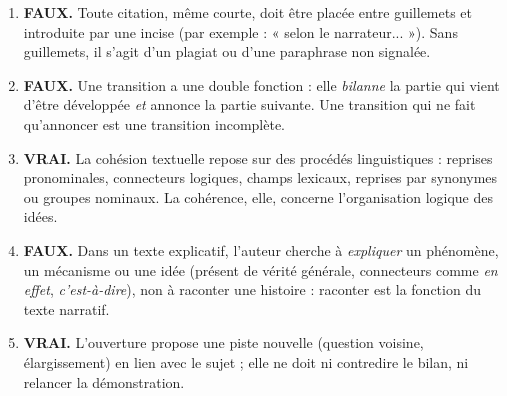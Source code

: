 \documentclass[11pt]{article}
\begin{document}
\begin{corrige}
\begin{enumerate}
\item \textbf{FAUX.} Toute citation, même courte, doit être placée entre guillemets et introduite par une incise (par exemple : « selon le narrateur... »). Sans guillemets, il s'agit d'un plagiat ou d'une paraphrase non signalée.
\item \textbf{FAUX.} Une transition a une double fonction : elle \emph{bilanne} la partie qui vient d'être développée \emph{et} annonce la partie suivante. Une transition qui ne fait qu'annoncer est une transition incomplète.
\item \textbf{VRAI.} La cohésion textuelle repose sur des procédés linguistiques : reprises pronominales, connecteurs logiques, champs lexicaux, reprises par synonymes ou groupes nominaux. La cohérence, elle, concerne l'organisation logique des idées.
\item \textbf{FAUX.} Dans un texte explicatif, l'auteur cherche à \emph{expliquer} un phénomène, un mécanisme ou une idée (présent de vérité générale, connecteurs comme \emph{en effet}, \emph{c'est-à-dire}), non à raconter une histoire : raconter est la fonction du texte narratif.
\item \textbf{VRAI.} L'ouverture propose une piste nouvelle (question voisine, élargissement) en lien avec le sujet ; elle ne doit ni contredire le bilan, ni relancer la démonstration.
\end{enumerate}
\end{corrige}
\end{document}
